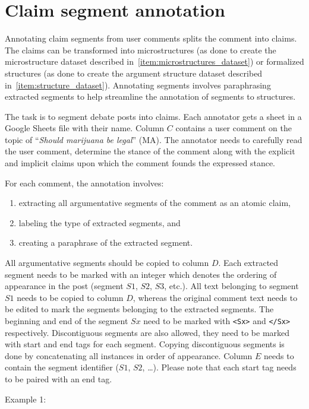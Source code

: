 \section{Claim segment annotation}
\label{sec:argseg_annotation}

Annotating claim segments from user comments splits the comment into claims. The
claims can be transformed into microstructures (as done to create the
microstructure dataset described in~\ref{item:microstructures_dataset}) or
formalized structures (as done to create the argument structure dataset
described in~\ref{item:structure_dataset}). Annotating segments involves
paraphrasing extracted segments to help streamline the annotation of segments
to structures. 

The task is to segment debate posts into claims. Each annotator gets a sheet in
a Google Sheets file with their name.  Column $C$ contains a user comment on
the topic of ``\textit{Should marijuana be legal}'' (MA).  The annotator needs
to carefully read the user comment, determine the stance of the comment along
with the explicit and implicit claims upon which the comment founds the
expressed stance. 

For each comment, the annotation involves:
\begin{enumerate}
\item extracting all argumentative segments of the comment as an atomic claim,
\item labeling the type of extracted segments, and
\item creating a paraphrase of the extracted segment.
\end{enumerate}
All argumentative segments should be copied to column $D$. 
Each extracted segment needs to be marked with an integer which denotes the
ordering of appearance in the post (segment $S1$, $S2$, $S3$, etc.).
All text belonging to segment $S1$ needs to be copied to column $D$, whereas
the original comment text needs to be edited to mark the segments belonging to 
the extracted segments. The beginning and end 
of the segment $Sx$ need to be marked with \texttt{<Sx>} and \texttt{</Sx>} respectively. 
Discontiguous segments are also allowed, they need to be marked with start and end tags
for each segment. Copying discontiguous segments is done by concatenating all 
instances in order of appearance. 
Column $E$ needs to contain the segment 
identifier ($S1$, $S2$, \dots). Please note that each start tag needs to be
paired with an end tag. 

\noindent Example 1: 


